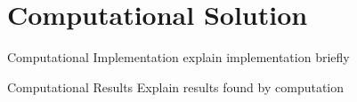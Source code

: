 \section{Computational Solution}

\begin{frame}{Computational Implementation}
    explain implementation briefly
\end{frame}

\begin{frame}{Computational Results}
    Explain results found by computation
\end{frame}